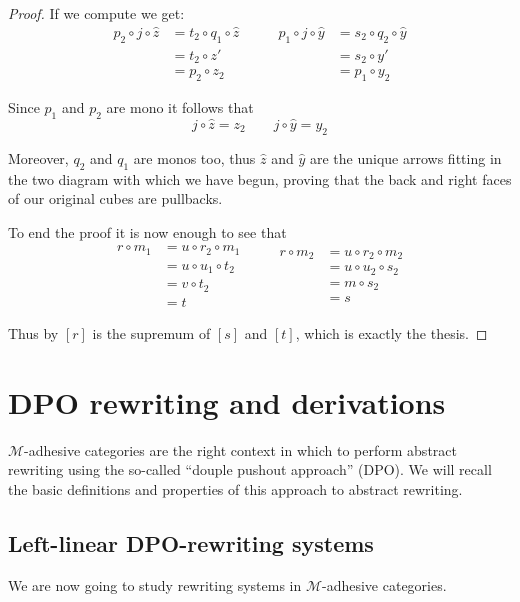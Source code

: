 \documentclass[a4paper]{article}
\theoremstyle{definition}
\begin{document}
\begin{proof}
	If we compute we get:
	\[\begin{split}
		p_2\circ j\circ \hat{z}&= t_2\circ q_1\circ \hat{z}\\&=t_2\circ z'\\&= p_2\circ z_2
	\end{split}\qquad \begin{split}
	p_1\circ j \circ \hat{y}&=s_2\circ q_2\circ \hat{y}\\&=s_2\circ y'\\&=p_1\circ y_2
	\end{split}\]
	
	Since $p_1$ and $p_2$ are mono it follows that 
	\[j\circ \hat{z}=z_2 \qquad j\circ \hat{y}=y_2\]
		
	Moreover, $q_2$ and $q_1$  are monos too, thus $\hat{z}$ and $\hat{y}$ are the unique arrows fitting in the two diagram with which we have begun, proving that the back and right faces of our original cubes are pullbacks.
	
	To end the proof it is now enough to see that 
	\[\begin{split}
	r\circ m_1&=u\circ r_2\circ m_1\\&=u\circ u_1\circ t_2\\&=v\circ t_2\\&=t
	\end{split}\qquad \begin{split}
	r\circ m_2&=u\circ r_2\circ m_2\\&=u\circ u_2\circ s_2\\&=m\circ s_2\\&=s
	\end{split}\]

Thus by  $[r]$ is the supremum of $[s]$ and $[t]$, which is exactly the thesis.	
\end{proof}





\section{DPO rewriting and derivations}

$\mathcal{M}$-adhesive categories are the right context in which to perform abstract rewriting using the so-called ``douple pushout approach'' (DPO). We will recall the basic definitions and properties of this approach to abstract rewriting. 

\subsection{Left-linear DPO-rewriting systems}
We are now going to study rewriting systems in $\mathcal{M}$-adhesive categories.
\end{document}
